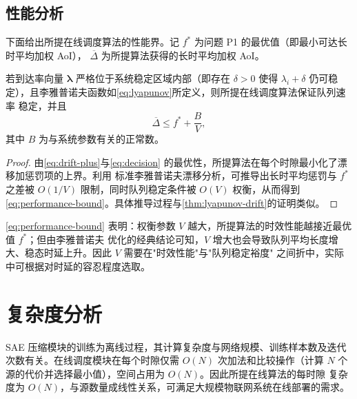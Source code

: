 \subsection{性能分析}

下面给出所提在线调度算法的性能界。记 $f^{\ast}$ 为问题 P1 的最优值（即最小可达长时平均加权 AoI），
$\overline{\Delta}$ 为所提算法获得的长时平均加权 AoI。

\begin{theorem}\label{thm:performance}
  若到达率向量 $\boldsymbol{\lambda}$ 严格位于系统稳定区域内部（即存在 $\delta>0$ 使得
  $\lambda_i+\delta$ 仍可稳定），且李雅普诺夫函数如\cref{eq:lyapunov}所定义，则所提在线调度算法保证队列速率
  稳定，并且
  \begin{equation}\label{eq:performance-bound}
    \overline{\Delta} \le f^{\ast} + \frac{B}{V},
  \end{equation}
  其中 $B$ 为与系统参数有关的正常数。
\end{theorem}

\begin{proof}
  由\cref{eq:drift-plus}与\cref{eq:decision} 的最优性，所提算法在每个时隙最小化了漂移加惩罚项的上界。利用
  标准李雅普诺夫漂移分析，可推导出长时平均惩罚与 $f^{\ast}$ 之差被 $O(1/V)$ 限制，同时队列稳定条件被
  $O(V)$ 权衡，从而得到\cref{eq:performance-bound}。具体推导过程与\cref{thm:lyapunov-drift}的证明类似。
\end{proof}

\cref{eq:performance-bound} 表明：权衡参数 $V$ 越大，所提算法的时效性能越接近最优值 $f^{\ast}$；但由李雅普诺夫
优化的经典结论可知，$V$ 增大也会导致队列平均长度增大、稳态时延上升。因此 $V$ 需要在"时效性能"与"队列稳定裕度"
之间折中，实际中可根据对时延的容忍程度选取。

\section{复杂度分析}

SAE 压缩模块的训练为离线过程，其计算复杂度与网络规模、训练样本数及迭代次数有关。在线调度模块在每个时隙仅需
$O(N)$ 次加法和比较操作（计算 $N$ 个源的代价并选择最小值），空间占用为 $O(N)$。因此所提在线算法的每时隙
复杂度为 $O(N)$，与源数量成线性关系，可满足大规模物联网系统在线部署的需求。
